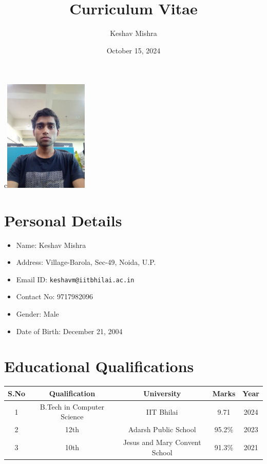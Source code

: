 \documentclass{article}
\title{Curriculum Vitae}
\author{Keshav Mishra}
\date{October 15, 2024}
\begin{document}
	\maketitle
	\begin{center}
		c\includegraphics[width=0.3\textwidth]{photo.jpg}
	\end{center}
	\section*{Personal Details}
	\begin{itemize}
		\item Name: Keshav Mishra
		\item Address: Village-Barola, Sec-49, Noida, U.P.
		\item Email ID: \texttt{keshavm@iitbhilai.ac.in}
		\item Contact No: 9717982096
		\item Gender: Male
		\item Date of Birth: December 21, 2004
	\end{itemize}
	
	\section*{Educational Qualifications}
	\begin{tabular}{|c|c|c|c|c|}
		\hline
		\textbf{S.No} & \textbf{Qualification} & \textbf{University} & \textbf{Marks} & \textbf{Year} \\
		\hline
		1 & B.Tech in Computer Science & IIT Bhilai & 9.71 & 2024 \\
		\hline
		2 & 12th & Adarsh Public School & 95.2\% & 2023 \\
		\hline
		3 & 10th & Jesus and Mary Convent School & 91.3\% & 2021 \\
		\hline
	\end{tabular}
	
\end{document}
